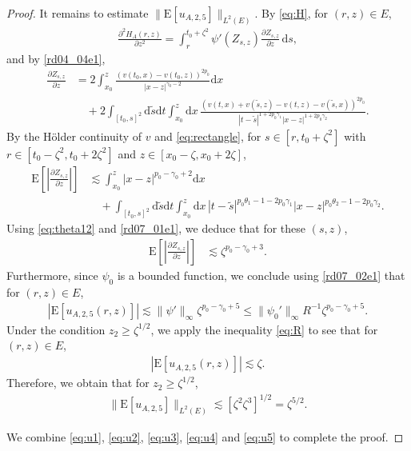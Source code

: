 \documentclass[12pt,a4paper]{article}
\newcommand{\E}{\mathrm{E}}
\renewcommand{\d}{\mathrm{d}}
\newcommand {\deltah}{{\zeta}}
\newcommand{\<}{\langle}
\renewcommand{\>}{\rangle}
\begin{document}
\begin{proof}
It remains to estimate $\|\E[u_{A,2,5}]\|_{L^2(E)}$. By \eqref{eq:H},  for $(r,z)\in E$,
           \begin{align}\label{eq:HAderi}
           \frac{\partial^2 H_A(r,z)}{\partial z^2}= \int_r^{t_0+\deltah^2}\psi'(Z_{s, z}) \frac{\partial Z_{s,z}}{\partial z}\, \d s,
           \end{align}
and by \eqref{rd04_04e1},
\begin{align}
             \frac{\partial Z_{s,z}}{\partial z}&=2\int_{x_0}^z \frac {(v(t_0,x)-v(t_0,z))^{2p_0}}{|x-z|^{\gamma_0-2} }\d x \nonumber\\
             &\quad +2 \int_{[t_0, s]^2}\d \tilde{s}\d t \int_{x_0}^z \d x\, \frac {(v(t,x)+v(\tilde{s},z)-v(t,z)-v(\tilde{s},x))^{2p_0}}{|t-\tilde{s}|^{1+2p_0\gamma_1}|x-z|^{1+2p_0\gamma_2}}. \label{eq:partialZ}
            \end{align}
By the H\"older continuity of $v$ and \eqref{eq:rectangle},
for $s\in[r, t_0+\deltah^2]$ with $r\in [t_0-\deltah^2, t_0+2\deltah^2]$ and $z\in [x_0-\deltah, x_0+2\deltah]$, 
          \begin{align*}
          \E\left[\left| \frac{\partial Z_{s,z}}{\partial z}\right|\right] &\lesssim  \int_{x_0}^z |x-z|^{p_0-\gamma_0+2}\d x \\
          &\quad + \int_{[t_0, s]^2}\d \tilde{s}\d t \int_{x_0}^z \d x \,
          |t-\tilde{s}|^{p_0\theta_1-1-2p_0\gamma_1}|x-z|^{p_0\theta_2-1-2p_0\gamma_2}.
          \end{align*}
Using \eqref{eq:theta12} and \eqref{rd07_01e1}, we deduce that
            for these $(s, z)$, %
          \begin{align*}
          \E\left[\left| \frac{\partial Z_{s,z}}{\partial z}\right|\right] &\lesssim \deltah^{p_0-\gamma_0+3}.
          \end{align*}
Furthermore, since $\psi_0$ is a bounded function, we conclude using \eqref{rd07_02e1} that for $(r,z)\in E$,
          \begin{align*}
          |\E[u_{A,2,5}(r,z)]| \lesssim \|\psi'\|_{\infty}\deltah^{p_0-\gamma_0+5} \leq  \|\psi_0'\|_{\infty}R^{-1}\deltah^{p_0-\gamma_0+5}.
          \end{align*}
           Under the condition $z_2\geq \deltah^{1/2}$, we apply the inequality \eqref{eq:R} to see that for $(r,z)\in E$,
                     \begin{align*}
          |\E[u_{A,2,5}(r,z)]| \lesssim \deltah.
          \end{align*}
          Therefore, we obtain that for $z_2\geq \deltah^{1/2}$,
          \begin{align}\label{eq:u5}
          \|\E[u_{A,2,5}]\|_{L^2(E)} \lesssim  [\deltah^2\deltah^3]^{1/2}=\deltah^{5/2}.
          \end{align}
          
We combine \eqref{eq:u1}, \eqref{eq:u2}, \eqref{eq:u3}, \eqref{eq:u4} and \eqref{eq:u5} to complete the proof. 
 \end{proof}
 
\end{document}
